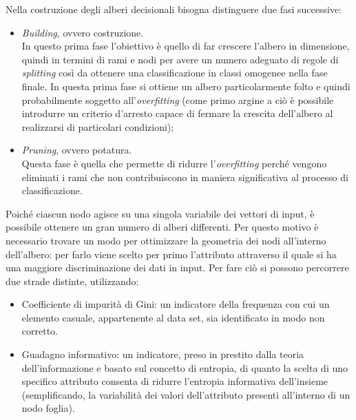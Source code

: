 Nella costruzione degli alberi decisionali bisogna distinguere due fasi successive:
\begin{itemize}
	\item \textit{Building}, ovvero costruzione.\\
	In questo prima fase l'obiettivo è quello di far crescere l'albero in dimensione, quindi in termini di rami e nodi per avere un numero adeguato di regole di \textit{splitting} così da ottenere una classificazione in classi omogenee nella fase finale. In questa prima fase si ottiene un albero particolarmente folto e quindi probabilmente soggetto all'\textit{overfitting} (come primo argine a ciò è possibile introdurre un criterio d'arresto capace di fermare la crescita dell'albero al realizzarsi di particolari condizioni);
	\item \textit{Pruning}, ovvero potatura.\\
	Questa fase è quella che permette di ridurre l'\textit{overfitting} perché vengono eliminati i rami che non contribuiscono in maniera significativa al processo di classificazione.
	
\end{itemize} 

Poiché ciascun nodo agisce su una singola variabile dei vettori di input, è possibile ottenere un gran numero di alberi differenti. Per questo motivo è necessario trovare un modo per ottimizzare la geometria dei nodi all'interno dell'albero: per farlo viene scelto per primo l'attributo attraverso il quale si ha una maggiore discriminazione dei dati in input. Per fare ciò si possono percorrere due strade distinte, utilizzando:
\begin{itemize}
	\item Coefficiente di impurità di Gini: un indicatore della frequenza con cui un elemento casuale, appartenente al data set, sia identificato in modo non corretto.
	\item Guadagno informativo: un indicatore, preso in prestito dalla teoria dell'informazione e basato sul concetto di entropia, di quanto la scelta di uno specifico attributo consenta di ridurre l’entropia informativa dell'insieme (semplificando, la variabilità dei valori dell'attributo presenti all'interno di un nodo foglia). 
\end{itemize}  


